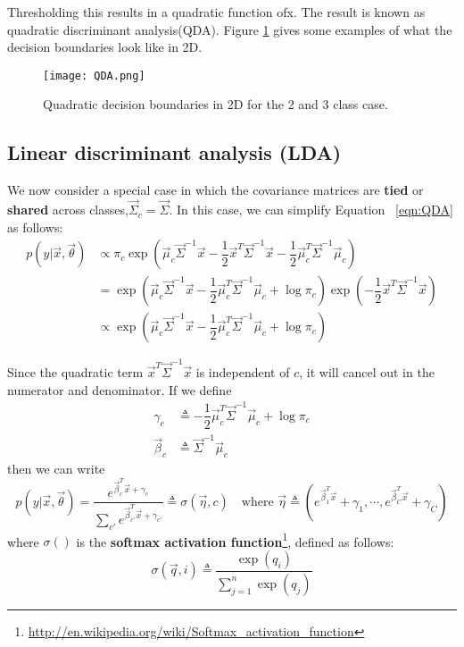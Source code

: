 Thresholding this results in a quadratic function ofx. The result is known as quadratic discriminant analysis(QDA). Figure \ref{fig:QDA} gives some examples of what the decision boundaries look like in 2D.

\begin{figure}[hbtp]
\centering
    \texttt{[image: QDA.png]}
\caption{Quadratic decision boundaries in 2D for the 2 and 3 class case.}
\label{fig:QDA} 
\end{figure}


\subsection{Linear discriminant analysis (LDA)}
\label{sec:Linear-discriminant-analysis}
We now consider a special case in which the covariance matrices are \textbf{tied} or \textbf{shared} across classes,$\vec{\Sigma}_c=\vec{\Sigma}$. In this case, we can simplify Equation ~\eqref{eqn:QDA} as follows:
\begin{align}
p(y|\vec{x},\vec{\theta})& \propto \pi_c\exp\left(\vec{\mu}_c\vec{\Sigma}^{-1}\vec{x}-\dfrac{1}{2}\vec{x}^T\vec{\Sigma}^{-1}\vec{x}-\dfrac{1}{2}\vec{\mu}_c^T\vec{\Sigma}^{-1}\vec{\mu}_c\right) \\
 & =\exp\left(\vec{\mu}_c\vec{\Sigma}^{-1}\vec{x}-\dfrac{1}{2}\vec{\mu}_c^T\vec{\Sigma}^{-1}\vec{\mu}_c+\log \pi_c\right)\exp\left(-\dfrac{1}{2}\vec{x}^T\vec{\Sigma}^{-1}\vec{x}\right) \\
 & \propto \exp\left(\vec{\mu}_c\vec{\Sigma}^{-1}\vec{x}-\dfrac{1}{2}\vec{\mu}_c^T\vec{\Sigma}^{-1}\vec{\mu}_c+\log \pi_c\right)
\end{align}

Since the quadratic term $\vec{x}^T\vec{\Sigma}^{-1}\vec{x}$ is independent of $c$, it will cancel out in the numerator and denominator. If we define
\begin{align}
\gamma_c& \triangleq -\dfrac{1}{2}\vec{\mu}_c^T\vec{\Sigma}^{-1}\vec{\mu}_c+\log \pi_c \\
\vec{\beta}_c& \triangleq \vec{\Sigma}^{-1}\vec{\mu}_c
\end{align}
then we can write
\begin{equation}\label{eqn:LDA}
p(y|\vec{x},\vec{\theta})=\dfrac{e^{\vec{\beta}_c^T\vec{x}+\gamma_c}}{\sum_{c'}e^{\vec{\beta}_{c'}^T\vec{x}+\gamma_{c'}}} \triangleq \sigma(\vec{\eta}, c) \quad \text{where } \vec{\eta} \triangleq (e^{\vec{\beta}_1^T\vec{x}}+\gamma_1,\cdots, e^{\vec{\beta}_C^T\vec{x}}+\gamma_C)
\end{equation}
where $\sigma()$ is the \textbf{softmax activation function}\footnote{\url{http://en.wikipedia.org/wiki/Softmax_activation_function}}, defined as follows:
\begin{equation}
\sigma(\vec{q},i) \triangleq \dfrac{\exp(q_i)}{\sum_{j=1}^n \exp(q_j)}
\end{equation}

